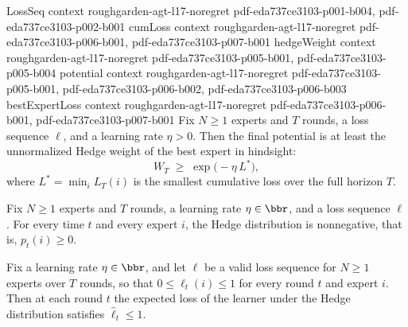 \begin{lemma}
\label{potential_ge_best_expert}
\leanok
{}
\proofstep
  {LossSeq}
  {context}
  {roughgarden-agt-l17-noregret}
  {pdf-eda737ce3103-p001-b004,
    pdf-eda737ce3103-p002-b001}
\proofstep
  {cumLoss}
  {context}
  {roughgarden-agt-l17-noregret}
  {pdf-eda737ce3103-p006-b001,
    pdf-eda737ce3103-p007-b001}
\proofstep
  {hedgeWeight}
  {context}
  {roughgarden-agt-l17-noregret}
  {pdf-eda737ce3103-p005-b001,
    pdf-eda737ce3103-p005-b004}
\proofstep
  {potential}
  {context}
  {roughgarden-agt-l17-noregret}
  {pdf-eda737ce3103-p005-b001,
    pdf-eda737ce3103-p006-b002,
    pdf-eda737ce3103-p006-b003}
\proofstep
  {bestExpertLoss}
  {context}
  {roughgarden-agt-l17-noregret}
  {pdf-eda737ce3103-p006-b001,
    pdf-eda737ce3103-p007-b001}
Fix $N \ge 1$ experts and $T$ rounds, a loss sequence $\ell$, and a learning rate $\eta
> 0$. Then the final potential is at least the unnormalized Hedge weight of the best
expert in hindsight:
\[
  W_T \;\ge\; \exp\!\bigl(-\eta \, L^*\bigr),
\]
where $L^* = \min_{i} L_T(i)$ is the smallest cumulative loss over the full horizon $T$.
\end{lemma}

\begin{lemma}
\label{hedgeDist_nonneg}
\leanok
{}
Fix $N \ge 1$ experts and $T$ rounds, a learning rate $\eta \in \bbr$, and a loss
sequence $\ell$. For every time $t$ and every expert $i$, the Hedge distribution is
nonnegative, that is, $p_t(i) \ge 0$.
\end{lemma}

\begin{lemma}
\label{hedgeLoss_le_one}
\leanok
{}
Fix a learning rate $\eta \in \bbr$, and let $\ell$ be a valid loss sequence for $N \ge
1$ experts over $T$ rounds, so that $0 \le \ell_t(i) \le 1$ for every round $t$ and
expert $i$. Then at each round $t$ the expected loss of the learner under the Hedge
distribution satisfies $\widehat{\ell}_t \le 1$.
\end{lemma}

